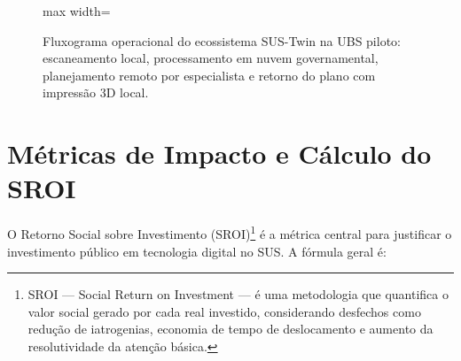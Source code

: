 \begin{figure}[htbp]
    \centering
    \begin{adjustbox}{max width=\textwidth}
\end{adjustbox}
    \caption{Fluxograma operacional do ecossistema SUS-Twin na UBS piloto:
    escaneamento local, processamento em nuvem governamental, planejamento
    remoto por especialista e retorno do plano com impressão 3D local.}
    \label{fig:sus-tele-odonto}
\end{figure}

\section{Métricas de Impacto e Cálculo do SROI}
\label{sec:sroi}

O Retorno Social sobre Investimento (SROI)\footnote{SROI — Social Return
on Investment — é uma metodologia que quantifica o valor social gerado
por cada real investido, considerando desfechos como redução de
iatrogenias, economia de tempo de deslocamento e aumento da
resolutividade da atenção básica.} é a métrica central para justificar
o investimento público em tecnologia digital no SUS. A fórmula geral é:

